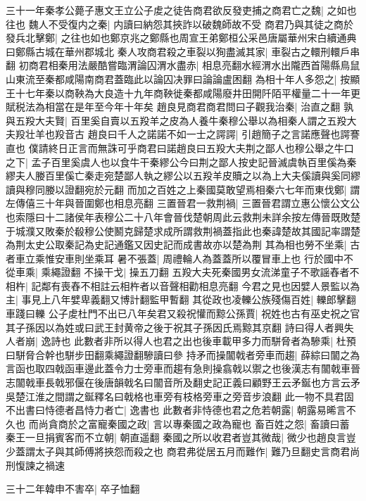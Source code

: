 三十一年秦孝公薨子惠文王立公子䖍之徒告商君欲反發吏捕之商君亡之魏|{
	之如也往也}
魏人不受復内之秦|{
	内讀曰納怨其挾詐以破魏師故不受}
商君乃與其徒之商於發兵北擊鄭|{
	之往也如也鄭京兆之鄭縣也周宣王弟鄭桓公采邑唐屬華州宋白續通典曰鄭縣古城在華州郡城北}
秦人攻商君殺之車裂以狥盡滅其家|{
	車裂古之轘刑轘戶串翻}
初商君相秦用法嚴酷嘗臨渭論囚渭水盡赤|{
	相息亮翻水經渭水出隴西首陽縣鳥鼠山東流至秦都咸陽南商君蓋臨此以論囚决罪曰論論盧困翻}
為相十年人多怨之|{
	按顯王十七年秦以商鞅為大良造十九年商鞅徙秦都咸陽廢井田開阡陌平權量二十一年更賦税法為相當在是年至今年十年矣}
趙良見商君商君問曰子觀我治秦|{
	治直之翻}
孰與五羖大夫賢|{
	百里奚自賣以五羖羊之皮為人養牛秦穆公舉以為相秦人謂之五羖大夫羖壮羊也羖音古}
趙良曰千人之諾諾不如一士之諤諤|{
	引趙簡子之言諾應聲也諤謇直也}
僕請終日正言而無誅可乎商君曰諾趙良曰五羖大夫荆之鄙人也穆公舉之牛口之下|{
	孟子百里奚虞人也以食牛干秦繆公今曰荆之鄙人按史記晉滅虞執百里傒為秦繆夫人媵百里傒亡秦走宛楚鄙人執之繆公以五羖羊皮贖之以為上大夫傒讀與奚同繆讀與穆同媵以證翻宛於元翻}
而加之百姓之上秦國莫敢望焉相秦六七年而東伐鄭|{
	謂左傳僖三十年與晉圍鄭也相息亮翻}
三置晉君一救荆禍|{
	三置晉君謂立惠公懷公文公也索隱曰十二諸侯年表穆公二十八年會晉伐楚朝周此云救荆未詳余按左傳晉既敗楚于城濮又敗秦於殽穆公使鬭克歸楚求成所謂救荆禍蓋指此也秦諱楚故其國記率謂楚為荆太史公取秦記為史記通鑑又因史記而成書故亦以楚為荆}
其為相也勞不坐乘|{
	古者車立乘惟安車則坐乘耳}
暑不張蓋|{
	周禮輪人為蓋蓋所以覆冒車上也}
行於國中不從車乘|{
	乘繩證翻}
不操干戈|{
	操五刀翻}
五羖大夫死秦國男女流涕童子不歌謡舂者不相杵|{
	記鄰有喪舂不相註云相杵者以音聲相勸相息亮翻}
今君之見也因嬖人景監以為主|{
	事見上八年嬖卑義翻又博計翻監甲暫翻}
其從政也凌轢公族殘傷百姓|{
	轢郎擊翻車踐曰轢}
公子䖍杜門不出已八年矣君又殺祝懽而黥公孫賈|{
	祝姓也古有巫史祝之官其子孫因以為姓或曰武王封黄帝之後于祝其子孫因氏焉黥其京翻}
詩曰得人者興失人者崩|{
	逸詩也}
此數者非所以得人也君之出也後車載甲多力而駢脅者為驂乘|{
	杜預曰駢脅合幹也駢步田翻乘繩證翻驂讀曰參}
持矛而操闟戟者旁車而趨|{
	薛綜曰闟之為言函也取四戟函車邊此蓋令力士旁車而趨有急則操翕戟以禦之也後漢志有闟戟車晉志闟戟車長戟邪偃在後唐韻戟名曰闟音所及翻史記正義曰顧野王云矛鋋也方言云矛吳楚江淮之間謂之鋋釋名曰戟格也車旁有枝格旁車之旁音步浪翻}
此一物不具君固不出書曰恃德者昌恃力者亡|{
	逸書也}
此數者非恃德也君之危若朝露|{
	朝露易晞言不久也}
而尚貪商於之富寵秦國之政|{
	言以專秦國之政為寵也}
畜百姓之怨|{
	畜讀曰蓄}
秦王一旦捐賓客而不立朝|{
	朝直遥翻}
秦國之所以收君者豈其微哉|{
	微少也趙良言豈少蓋謂太子與其師傅將挾怨而殺之也}
商君弗從居五月而難作|{
	難乃旦翻史言商君尚刑愎諫之禍速}


三十二年韓申不害卒|{
	卒子恤翻}


